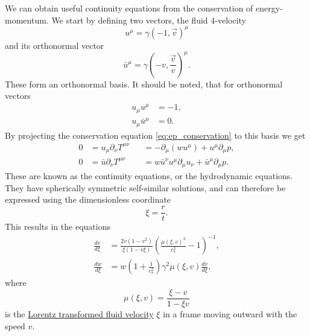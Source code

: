 We can obtain useful continuity equations from the conservation of energy-momentum.
We start by defining two vectors, the fluid 4-velocity
\begin{equation}
u^\mu = \gamma(-1, \overrightarrow{v})^\mu
\end{equation}
and its orthonormal vector
\begin{equation}
\bar{u}^\mu = \gamma(-v, \frac{\overrightarrow{v}}{v})^\mu.
\end{equation}
These form an orthonormal basis.
It should be noted, that for orthonormal vectors
\begin{align}
u_\mu u^\mu &= -1, \\
u_\mu \bar{u}^\mu &= 0.
\end{align}
By projecting the conservation equation \eqref{eq:ep_conservation} to this basis we get
\cite[eq. 7.28-7.29]{lecture_notes}
\begin{align}
0 &= u_\mu \partial_\nu T^{\mu \nu}   &&= -\partial_\mu (w u^\mu) + u^\mu \partial_\mu p, \\
0 &= \bar{u} \partial_\nu T^{\mu \nu} &&= w \bar{u}^\nu u^\mu \partial_\mu u_\nu + \bar{u}^\mu \partial_\mu p.
\end{align}
These are known as the continuity equations, or the hydrodynamic equations. 
They have spherically symmetric self-similar solutions, and can therefore be expressed using the dimensionless coordinate
\begin{equation}
\xi = \frac{r}{t}.
\end{equation}
This results in the equations
\cites[eq. 7.30-7.31]{lecture_notes}[eq. 5]{giese_2021}
\begin{align}
\frac{dv}{d\xi} &= \frac{2v(1-v^2)}{\xi(1-v\xi)} \left( \frac{\mu(\xi,v)^2}{c_s^2} - 1 \right)^{-1},
\label{eq:hydro1}
\\
\frac{dw}{d\xi} &= w \left( 1 + \frac{1}{c_s^2} \right) \gamma^2 \mu(\xi,v) \frac{dv}{d\xi},
\label{eq:hydro2}
\end{align}
where
\begin{equation}
\mu(\xi,v) = \frac{\xi - v}{1 - \xi v}
\end{equation}
is the
\href{https://en.wikipedia.org/wiki/Velocity-addition_formula#Standard_configuration}{Lorentz transformed fluid velocity}
$\xi$ in a frame moving outward with the speed $v$.

